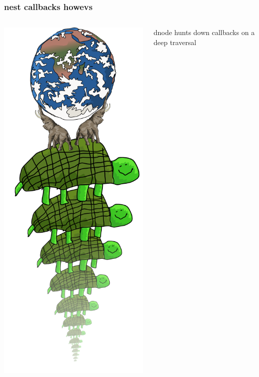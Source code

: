 \documentclass{beamer}
\begin{document}
\begin{frame}
    \frametitle{nest callbacks howevs}
    \begin{columns}[c]
        \includegraphics[scale=0.28]{images/all_the_way_down.png}
        \begin{center}
        \fbox{}
        \newline
        
        \huge
        dnode hunts down callbacks on a deep traversal
        
        \end{center}
    \end{columns}
\end{frame}
\end{document}
